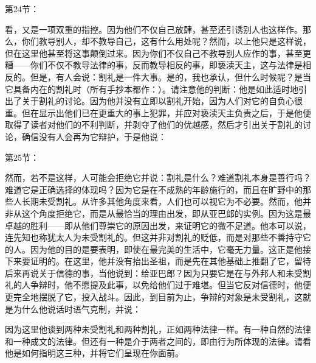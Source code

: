 第24节： \par

看，又是一项双重的指控。因为他们不仅自己放肆，甚至还引诱别人也这样作。那么，你们教导别人，却不教导自己，这有什么用处呢？然而，以上他只是这样说，但在这里他甚至将这事颠倒过来。因为你们不仅自己不教导别人应作的事，甚至更糟——你们不仅不教导法律的事，反而教导相反的事，即亵渎天主，这与法律是相反的。但是，有人会说：割礼是一件大事。是的，我也承认，但什么时候呢？是当它具备内在的割礼时（所有手抄本都作：）。请注意他的判断：他是如此适时地引出了关于割礼的讨论。因为他并没有立即以割礼开始，因为人们对它的自负心很重。但在显示出他们已在更重大的事上犯罪，并应对亵渎天主负责之后，于是他便取得了读者对他们的不利判断，并剥夺了他们的优越感，然后才引出关于割礼的讨论，确信没有人会再为它辩护，于是他说：\par

第25节：\par

然而，若不是这样，人可能会拒绝它并说：割礼是什么？难道割礼本身是善行吗？难道它是正确选择的体现吗？因为它是在不成熟的年龄施行的，而且在旷野中的那些人长期未受割礼。从许多其他角度来看，人们也可以视它为不必要。然而，他并非从这个角度拒绝它，而是从最恰当的理由出发，即从亚巴郎的实例。因为这是最卓越的胜利——即从他们尊崇它的原因出发，来证明它的微不足道。他本可以说，连先知也称犹太人为未受割礼的。但这并非对割礼的贬低，而是对那些不善持守它的人。因为他的目的是要表明，即使在最完美的生活中，它毫无力量。这正是他接下来要证明的。在这里，他并没有抬出圣祖，而是先在其他基础上推翻了它，留待后来再说关于信德的事，当他说到：给亚巴郎？因为只要它是在与外邦人和未受割礼的人争辩时，他不愿提及此事，以免给他们过于难堪。但当它反对信德时，他便更完全地摆脱了它，投入战斗。因此，到目前为止，争辩的对象是未受割礼，这就是为什么他说话时语气克制，并说：\par

因为这里他谈到两种未受割礼和两种割礼，正如两种法律一样。有一种自然的法律和一种成文的法律。但还有一种是介于两者之间的，即由行为所体现的法律。请看他是如何指明这三种，并将它们呈现在你面前。\par

